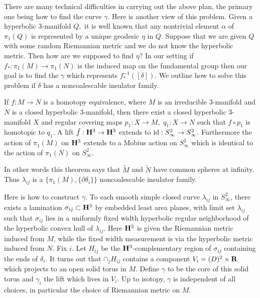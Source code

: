 There are many technical difficulties in carrying out the above plan, the
primary one being how to
find the curve $\gamma$.  Here is another view of this problem.  Given a
hyperbolic 3-manifold $Q,$ it
is well known that any nontrivial element $\alpha$ of $\pi_1(Q)$ is
represented by a unique geodesic
$\eta$ in $Q.$  Suppose that we are given $Q$ with some random Riemannian
metric and we do not know the
hyperbolic metric. Then \pagebreak how are we supposed to find $\eta$?
  In our setting if
$f_*:\pi_1(M)\to\pi_1(N)$ is the induced map on the fundamental group then our goal is to find the $\gamma$ which represents
$f^{-1}_*([\delta])$.  We outline how to solve this problem if $\delta$ has a noncoalescable insulator family. 
 
 
 
 If $f:M\to N$ is  a homotopy
equivalence{\rm ,} where
$M$ is an irreducible  $3$\/{\rm -}\/manifold  and $N$ is a closed
hyperbolic $3$\/{\rm -}\/manifold{\rm ,} then there exist  a closed hyperbolic $3$\/{\rm -}\/manifold $X$ and
regular covering maps  $p_1:X\to M,$ $ q_1:X\to N$ such that $f\circ
p_1$ is
homotopic to $q_1$.  A lift $\tilde f: {\bf H}^3\to{\bf H}^3$ extends to
${\rm id}:S^2_{\infty} \to S^2_{\infty}$.
Furthermore the action of $\pi_1(M)$ on ${\bf H}^3$
extends to a Mobius action on $S^2_{\infty}$
which
is identical to the action of $\pi_1(N)$ on $S^2_{\infty}$.\endproclaim


In other words this theorem says that $\tilde M$ and $\tilde N$ have common spheres at
infinity.  Thus $\lambda_{ij}$  is a $\{\pi_1(M),\{\partial\delta_i\}\}$
noncoalescable insulator family.

Here is how to construct $\gamma$.  To each smooth simple closed
curve
$\lambda_{ij}$ in  $S^2_{\infty}$, there exists a lamination
$\sigma_{ij} \subset {\bf H}^3$ by
embedded least area planes,  with limit set
$\lambda_{ij}$ such that $\sigma_{ij}$ lies in a 
uniformly fixed width
hyperbolic regular
neighborhood of the hyperbolic convex
hull of $\lambda_{ij}$.   Here ${\bf H}^3$ is given the Riemannian metric induced from $M$,
while the  fixed width measurement is via the hyperbolic metric
induced from $N.$
Fix $i$.  Let
$H_{ij}$ be the ${\bf H}^3$-complementary region of $\sigma_{ij}$
containing the ends of $\delta_i$.
It turns out that $\mathbold{\cap}_j H_{ij}$ contains a component
$V_i=(\dcirc)^2 \times {\bf R}$
which projects to an open  solid torus in $M$.  Define
$\gamma$ to be the core of this solid torus
and
$\gamma_i$ the lift which lives in $V_i$.
Up to isotopy,
$\gamma$ is independent of all choices, in particular the choice of
Riemannian metric on
$M$.

